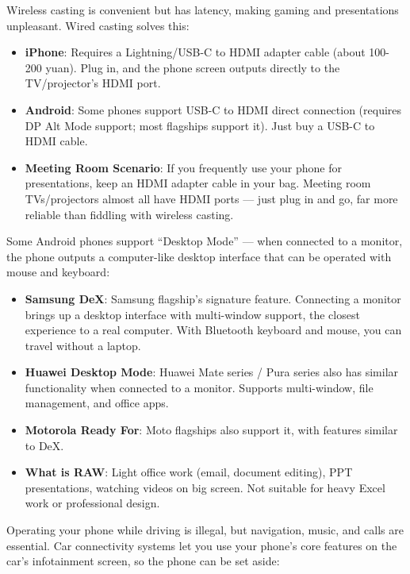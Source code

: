 Wireless casting is convenient but has latency, making gaming and presentations unpleasant. Wired casting solves this:

\begin{itemize}
  \item \textbf{iPhone}: Requires a Lightning/USB-C to HDMI adapter cable (about 100-200 yuan). Plug in, and the phone screen outputs directly to the TV/projector's HDMI port.
  \item \textbf{Android}: Some phones support USB-C to HDMI direct connection (requires DP Alt Mode support; most flagships support it). Just buy a USB-C to HDMI cable.
  \item \textbf{Meeting Room Scenario}: If you frequently use your phone for presentations, keep an HDMI adapter cable in your bag. Meeting room TVs/projectors almost all have HDMI ports — just plug in and go, far more reliable than fiddling with wireless casting.
\end{itemize}


Some Android phones support “Desktop Mode” — when connected to a monitor, the phone outputs a computer-like desktop interface that can be operated with mouse and keyboard:

\begin{itemize}
  \item \textbf{Samsung DeX}: Samsung flagship's signature feature. Connecting a monitor brings up a desktop interface with multi-window support, the closest experience to a real computer. With Bluetooth keyboard and mouse, you can travel without a laptop.
  \item \textbf{Huawei Desktop Mode}: Huawei Mate series / Pura series also has similar functionality when connected to a monitor. Supports multi-window, file management, and office apps.
  \item \textbf{Motorola Ready For}: Moto flagships also support it, with features similar to DeX.
  \item \textbf{What is RAW}: Light office work (email, document editing), PPT presentations, watching videos on big screen. Not suitable for heavy Excel work or professional design.
\end{itemize}


Operating your phone while driving is illegal, but navigation, music, and calls are essential. Car connectivity systems let you use your phone's core features on the car's infotainment screen, so the phone can be set aside:

